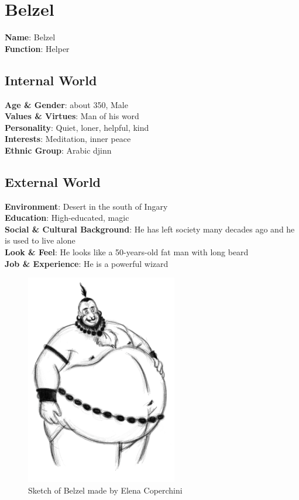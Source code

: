 \section{Belzel}

\begin{minipage}{0.5\textwidth}
\textbf{Name}: Belzel \\
\textbf{Function}: Helper

\subsection{Internal World}

\textbf{Age \& Gender}: about 350, Male \\
\textbf{Values \& Virtues}: Man of his word  \\
\textbf{Personality}: Quiet, loner, helpful, kind \\
\textbf{Interests}: Meditation, inner peace \\
\textbf{Ethnic Group}: Arabic djinn

\subsection{External World}
\textbf{Environment}: Desert in the south of Ingary  \\
\textbf{Education}: High-educated, magic \\
\textbf{Social \& Cultural Background}: He has left society many decades ago and he is used to live alone \\
\textbf{Look \& Feel}: He looks like a 50-years-old fat man with long beard \\
\textbf{Job \& Experience}: He is a powerful wizard \\

\end{minipage}%
%
\hfill\begin{minipage}{0.4\textwidth}
  \begin{figure}[H]
    \hfill\includegraphics{Images/Characters/belzel_portrait}
    \caption{Sketch of Belzel made by Elena Coperchini}
  \end{figure}
\end{minipage}

